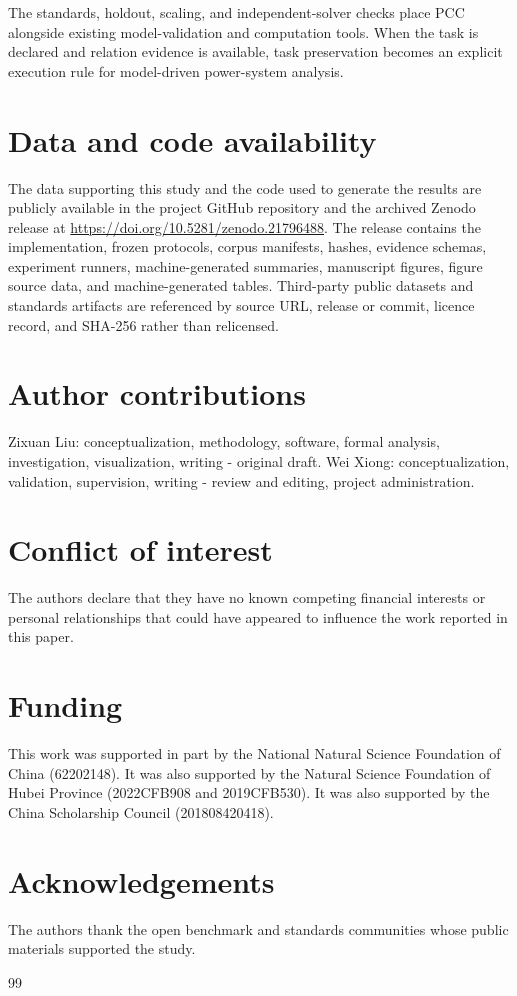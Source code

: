 \documentclass[preprint,12pt]{elsarticle}
\begin{document}
The standards, holdout, scaling, and independent-solver checks place PCC alongside existing model-validation and computation tools. When the task is declared and relation evidence is available, task preservation becomes an explicit execution rule for model-driven power-system analysis.

\section*{Data and code availability}
The data supporting this study and the code used to generate the results are publicly available in the project GitHub repository and the archived Zenodo release at \url{https://doi.org/10.5281/zenodo.21796488}. The release contains the implementation, frozen protocols, corpus manifests, hashes, evidence schemas, experiment runners, machine-generated summaries, manuscript figures, figure source data, and machine-generated tables. Third-party public datasets and standards artifacts are referenced by source URL, release or commit, licence record, and SHA-256 rather than relicensed.

\section*{Author contributions}
Zixuan Liu: conceptualization, methodology, software, formal analysis, investigation, visualization, writing - original draft. Wei Xiong: conceptualization, validation, supervision, writing - review and editing, project administration.

\section*{Conflict of interest}
The authors declare that they have no known competing financial interests or personal relationships that could have appeared to influence the work reported in this paper.

\section*{Funding}
This work was supported in part by the National Natural Science Foundation of China (62202148).
It was also supported by the Natural Science Foundation of Hubei Province (2022CFB908 and 2019CFB530).
It was also supported by the China Scholarship Council (201808420418).

\section*{Acknowledgements}
The authors thank the open benchmark and standards communities whose public materials supported the study.

\begin{thebibliography}{99}
\sloppy

\end{thebibliography}
\end{document}
